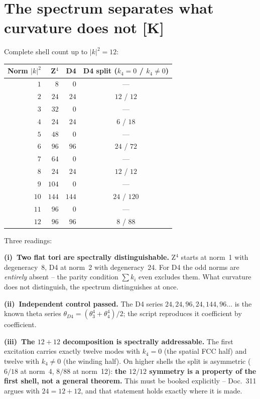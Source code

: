 \documentclass[11pt]{report}
\begin{document}
\chapter{The spectrum separates what curvature does not [K]}

Complete shell count up to $|k|^2 = 12$:

\begin{center}
\begin{tabular}{rrrc}
\toprule
Norm $|k|^2$ & Z$^4$ & D4 & D4 split ($k_4{=}0$ / $k_4{\ne}0$) \\
\midrule
$1$ & $8$ & $0$ & --- \\
$2$ & $24$ & $24$ & $12$ / $12$ \\
$3$ & $32$ & $0$ & --- \\
$4$ & $24$ & $24$ & $6$ / $18$ \\
$5$ & $48$ & $0$ & --- \\
$6$ & $96$ & $96$ & $24$ / $72$ \\
$7$ & $64$ & $0$ & --- \\
$8$ & $24$ & $24$ & $12$ / $12$ \\
$9$ & $104$ & $0$ & --- \\
$10$ & $144$ & $144$ & $24$ / $120$ \\
$11$ & $96$ & $0$ & --- \\
$12$ & $96$ & $96$ & $8$ / $88$ \\
\bottomrule
\end{tabular}
\end{center}

Three readings:

\textbf{(i)~Two flat tori are spectrally distinguishable.} Z$^4$
starts at norm~1 with degeneracy~8, D4 at norm~2 with degeneracy~24.
For D4 the odd norms are \emph{entirely} absent -- the parity
condition $\sum k_i$ even excludes them. What curvature does not
distinguish, the spectrum distinguishes at once.

\textbf{(ii)~Independent control passed.} The D4 series
$24, 24, 96, 24, 144, 96 \dots$ is the known theta series
$\theta_{D4} = (\theta_3^4 + \theta_4^4)/2$; the script reproduces
it coefficient by coefficient.

\textbf{(iii)~The $12+12$ decomposition is spectrally
addressable.} The first excitation carries exactly twelve modes with
$k_4 = 0$ (the spatial FCC half) and twelve with $k_4 \ne 0$ (the
winding half). On higher shells the split is asymmetric ($6/18$ at
norm~4, $8/88$ at norm~12): \textbf{the $12/12$ symmetry is a
property of the first shell, not a general theorem.} This must be
booked explicitly -- Doc.~311 argues with $24 = 12+12$, and that
statement holds exactly where it is made.
\end{document}

